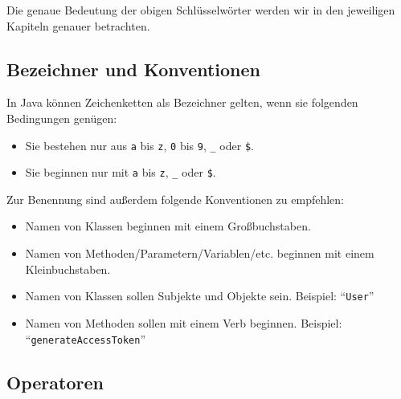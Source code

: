 	Die genaue Bedeutung der obigen Schlüsselwörter werden wir in den jeweiligen Kapiteln genauer betrachten.

\subsection{Bezeichner und Konventionen}
	
	In Java können Zeichenketten als Bezeichner gelten, wenn sie folgenden Bedingungen genügen:
	\begin{itemize}
		\item Sie bestehen nur aus \texttt{a} bis \texttt{z}, \texttt{0} bis \texttt{9}, \texttt{\_} oder \texttt{\$}.
		\item Sie beginnen nur mit \texttt{a} bis \texttt{z}, \texttt{\_} oder \texttt{\$}.
	\end{itemize}
	
	Zur Benennung sind außerdem folgende Konventionen zu empfehlen:
	\begin{itemize}
		\item Namen von Klassen beginnen mit einem Großbuchstaben.
		\item Namen von Methoden/Parametern/Variablen/etc. beginnen mit einem Kleinbuchstaben.
		\item Namen von Klassen sollen Subjekte und Objekte sein. Beispiel: \enquote{\texttt{User}}
		\item Namen von Methoden sollen mit einem Verb beginnen. Beispiel: \enquote{\texttt{generateAccessToken}}
	\end{itemize}
	

\subsection{Operatoren}
	
